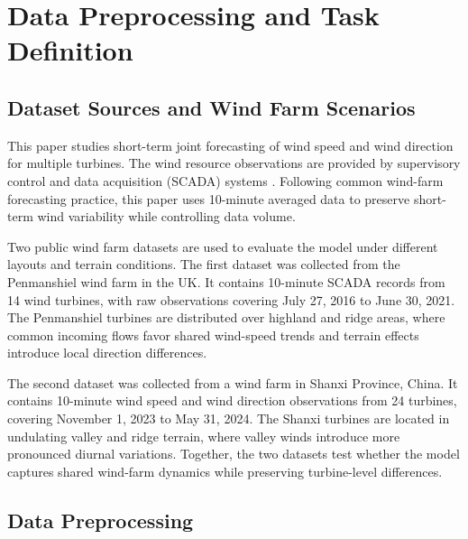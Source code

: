 \section{Data Preprocessing and Task Definition}
\label{sec:data_preprocessing_task}

\subsection{Dataset Sources and Wind Farm Scenarios}

This paper studies short-term joint forecasting of wind speed and wind direction for multiple turbines. The wind resource observations are provided by supervisory control and data acquisition (SCADA) systems \cite{Boyer2009SCADABook,MaldonadoCorrea2020UsingSCADADataWindTurbineConditionMonitoring}. Following common wind-farm forecasting practice, this paper uses 10-minute averaged data to preserve short-term wind variability while controlling data volume.

Two public wind farm datasets are used to evaluate the model under different layouts and terrain conditions. The first dataset was collected from the Penmanshiel wind farm in the UK. It contains 10-minute SCADA records from 14 wind turbines, with raw observations covering July 27, 2016 to June 30, 2021. The Penmanshiel turbines are distributed over highland and ridge areas, where common incoming flows favor shared wind-speed trends and terrain effects introduce local direction differences.


The second dataset was collected from a wind farm in Shanxi Province, China. It contains 10-minute wind speed and wind direction observations from 24 turbines, covering November 1, 2023 to May 31, 2024. The Shanxi turbines are located in undulating valley and ridge terrain, where valley winds introduce more pronounced diurnal variations. Together, the two datasets test whether the model captures shared wind-farm dynamics while preserving turbine-level differences.

\subsection{Data Preprocessing}


